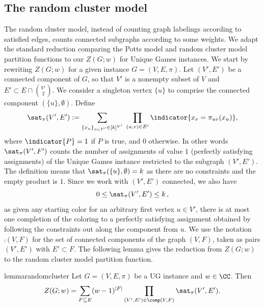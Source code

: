 \subsection{The random cluster model}
%
The random cluster model, instead of counting graph labelings according to satisfied edges, counts connected subgraphs according to some weights. 
We adapt the standard reduction comparing the Potts model and random cluster model partition functions to our $Z(G;w)$ for Unique Games instances.
%
We start by rewriting $Z(G;w)$ for a given instance $G=(V,E,\pi)$. 
Let $(V',E')$ be a connected component of $G$, so that $V'$ is a nonempty subset of $V$ and $E'\subset E\cap \binom{V'}{2}$. 
We consider a singleton vertex $\{u\}$ to comprise the connected component $(\{u\},\emptyset)$. 
Define
\[
\sat_\pi(V',E'):=\sum_{\{x_u\}_{u\in V'}\in[k]^{V'}}\;\prod_{(u,v)\in E'}\indicator{x_v=\pi_{uv}(x_u)},
\]
where $\indicator{P}=1$ if $P$ is true, and $0$ otherwise. 
In other words $\sat_\pi(V',F')$ counts the number of assignments of value $1$ (perfectly satisfying assignments) of the Unique Games instance restricted to the subgraph $(V',E')$. 
The definition means that $\sat_\pi(\{u\},\emptyset)=k$ as there are no constraints and the empty product is $1$.
Since we work with $(V',E')$ connected, we also have 
\begin{equation}\label{eq:con}
0\le \sat_\pi(V', E')\le k\,,
\end{equation}
as given any starting color for an arbitrary first vertex $u\in V'$, there is at most one completion of the coloring to a perfectly satisfying assignment obtained by following the constraints out along the component from $u$. 
%
We use the notation $\comp(V, F)$ for the set of connected components of the graph $(V, F)$, taken as pairs $(V', E')$ with $E'\subset F$. 
The following lemma gives the reduction from $Z(G;w)$ to the random cluster model partition function.
%
%
\begin{restatable}{lemma}{randomcluster}\label{lem:random cluster}
Let $G=(V,E,\pi)$ be a UG instance and $w\in\CC$.
Then 
\[
Z(G;w)=\sum_{F\subseteq E} (w-1)^{|F|} \prod_{(V',E')\in\comp(V,F)} \sat_{\pi}(V',E').
\]
\end{restatable}
%

%
